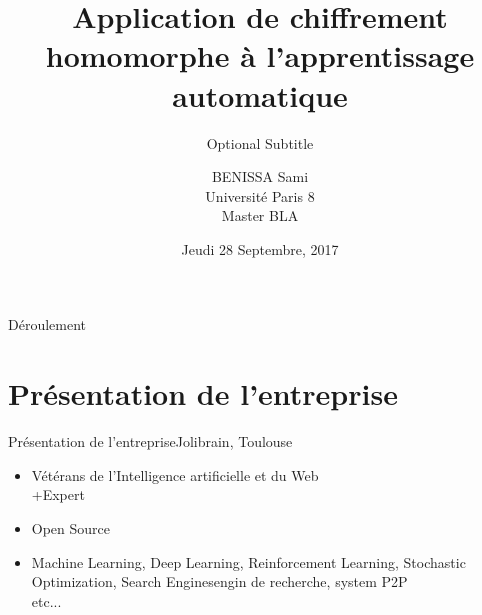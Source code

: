 \documentclass{beamer}
\title{Application de chiffrement homomorphe à l'apprentissage automatique}
\subtitle{Optional Subtitle}
\author{BENISSA Sami \\
      Université Paris 8\\
    Master BLA}
\institute[Jolibrain, Toulouse, France] %
\date{Jeudi 28 Septembre, 2017}
\begin{document}
\begin{frame}
  \titlepage
\end{frame}

\begin{frame}{Déroulement}
  \tableofcontents
\end{frame}

\section{Présentation de l'entreprise}


\begin{frame}{Présentation de l'entreprise}{Jolibrain, Toulouse}
\begin{itemize}
  \item {
    Vétérans de l'Intelligence artificielle et du Web\\
    +Expert
    \pause %
  }
  \item {   
    Open Source
    \pause
  }
    \item {   
      Machine Learning, Deep Learning, Reinforcement Learning, Stochastic Optimization, Search Enginesengin de recherche, system P2P \\
      etc...
    \pause
    }
\end{itemize}
\end{frame}
\end{document}
